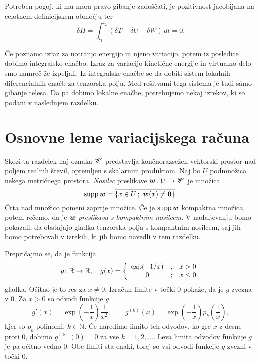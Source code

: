 \begin{posledica} \label{p:varham0}
	Potreben pogoj, ki mu mora pravo gibanje zadoščati, je pozitivnost jacobijana
	na celotnem definicijskem območju ter
	\[ \delta H = \int_{t_1}^{t_2}(\delta T-\delta U-\delta W)\,dt = 0. \]
\end{posledica}

Če poznamo izraz za notranjo energijo in njeno variacijo, potem iz posledice
dobimo integralsko enačbo. Izraz za variacijo kinetične energije in virtualno delo 
smo namreč že izpeljali. Iz integralske enačbe se da dobiti sistem lokalnih diferencialnih enačb
za tenzorska polja. Med rešitvami tega sistema je tudi sámo gibanje telesa.
Da pa dobimo lokalne enačbe, potrebujemo nekaj izrekov, ki so podani v naslednjem razdelku.


\section{Osnovne leme variacijskega računa}


Skozi ta razdelek naj oznaka $\mathscr W$ predstavlja
končnorazsežen vektorski prostor nad poljem realnih števil, opremljen s skalarnim produktom.
Naj bo $U$ podmnožica nekega metričnega prostora.
\emph{Nosilec} preslikave $\boldsymbol w\colon U\to\mathscr W$ je množica
\[ \mathrm{supp}\,\vek{w}=\overline{\{ x\in U\,;\ \vek{w}(x)\neq\vek{0} \}}. \]
Črta nad množico pomeni zaprtje množice. Če je $\mathrm{supp}\,\boldsymbol w$ kompaktna množi\-ca, potem rečemo,
da je $\boldsymbol w$ \emph{preslikava s kompaktnim nosilcem}. V nadaljevanju bomo pokazali, da obstajajo gladka
tenzorska polja s kompaktnim nosilcem, saj jih bomo potrebovali v izrekih, ki jih bomo navedli v tem razdelku.

Prepričajmo se, da je funkcija
\[
	g\colon\mathbb R\to\mathbb R,\quad g(x)=\left\{\begin{array}{ccl}
	\exp(-1/x)&;&x>0 \\ 0&;&x\leq 0 \end{array}\right.
\]
gladka. Očitno je to res za $x\neq 0$. Izračun limite v točki $0$ pokaže, da
je $g$ zvezna v 0. Za $x>0$ so odvodi funkcije $g$
\[
	g'(x)=\exp\left(-\frac{1}{x}\right)\frac{1}{x^2},\qquad
	g^{(k)}(x)=\exp\left(-\frac{1}{x}\right)p_k\left(\frac{1}{x}\right),
\]
kjer so $p_k$ polinomi, $k\in\mathbb{N}$. Če naredimo limito teh odvodov, ko
gre $x$ z desne proti 0, dobimo $g^{(k)}(0)=0$ za vse $k=1,2,\dots$. Leva limita
odvodov funkcije $g$ je pa očitno vedno 0. Obe limiti sta enaki, torej so vsi odvodi
funkcije $g$ zvezni v točki 0.

